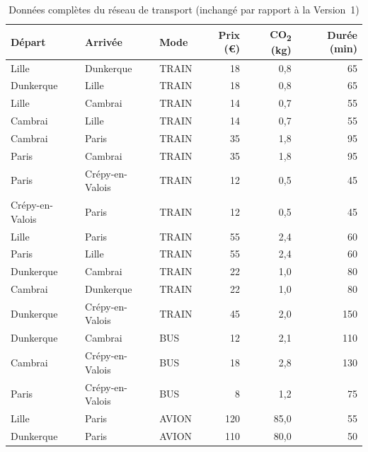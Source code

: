 \documentclass[fontsize=10pt,oneside,parskip=half]{scrreprt}
\begin{document}
\begin{table}[H]
  \centering
  \small
  \begin{tabular}{lllrrr}
    \toprule
    \textbf{Départ} & \textbf{Arrivée} & \textbf{Mode}
      & \textbf{Prix (€)} & \textbf{CO\textsubscript{2} (kg)}
      & \textbf{Durée (min)} \\
    \midrule
    Lille             & Dunkerque         & TRAIN  & 18  & 0{,}8  & 65  \\
    Dunkerque         & Lille             & TRAIN  & 18  & 0{,}8  & 65  \\
    Lille             & Cambrai           & TRAIN  & 14  & 0{,}7  & 55  \\
    Cambrai           & Lille             & TRAIN  & 14  & 0{,}7  & 55  \\
    Cambrai           & Paris             & TRAIN  & 35  & 1{,}8  & 95  \\
    Paris             & Cambrai           & TRAIN  & 35  & 1{,}8  & 95  \\
    Paris             & Crépy-en-Valois   & TRAIN  & 12  & 0{,}5  & 45  \\
    Crépy-en-Valois   & Paris             & TRAIN  & 12  & 0{,}5  & 45  \\
    Lille             & Paris             & TRAIN  & 55  & 2{,}4  & 60  \\
    Paris             & Lille             & TRAIN  & 55  & 2{,}4  & 60  \\
    Dunkerque         & Cambrai           & TRAIN  & 22  & 1{,}0  & 80  \\
    Cambrai           & Dunkerque         & TRAIN  & 22  & 1{,}0  & 80  \\
    Dunkerque         & Crépy-en-Valois   & TRAIN  & 45  & 2{,}0  & 150 \\
    Dunkerque         & Cambrai           & BUS    & 12  & 2{,}1  & 110 \\
    Cambrai           & Crépy-en-Valois   & BUS    & 18  & 2{,}8  & 130 \\
    Paris             & Crépy-en-Valois   & BUS    & 8   & 1{,}2  & 75  \\
    Lille             & Paris             & AVION  & 120 & 85{,}0 & 55  \\
    Dunkerque         & Paris             & AVION  & 110 & 80{,}0 & 50  \\
    \bottomrule
  \end{tabular}
  \caption{Données complètes du réseau de transport (inchangé par rapport à la Version~1)}
\end{table}
\end{document}
